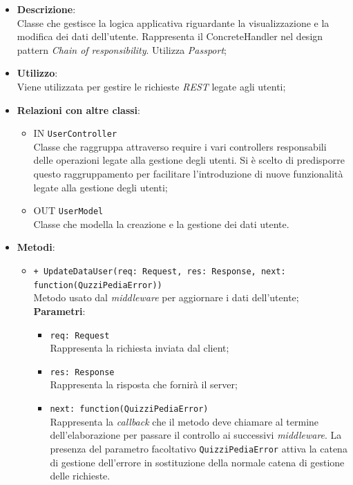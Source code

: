 \begin{itemize}
	\item 
	\textbf{Descrizione}:\\
	Classe che gestisce la logica applicativa riguardante la visualizzazione e la modifica dei dati dell'utente.
Rappresenta il ConcreteHandler nel design pattern \textit{Chain of responsibility}. Utilizza \textit{Passport};
	\item
	\textbf{Utilizzo}:\\
	Viene utilizzata per gestire le richieste \textit{REST} legate agli utenti;
	\item
	\textbf{Relazioni con altre classi}:
	\begin{itemize}
		\item
		IN \texttt{UserController} \\
		Classe che raggruppa attraverso require i vari controllers responsabili delle operazioni legate alla gestione degli utenti. Si è scelto di predisporre questo raggruppamento per facilitare l'introduzione di nuove funzionalità legate alla gestione degli utenti;
		\item
		OUT \texttt{UserModel} \\
		Classe che modella la creazione e la gestione dei dati utente.
	\end{itemize}
	\item
	\textbf{Metodi}:
	\begin{itemize}
		\item
		\texttt{+ UpdateDataUser(req: Request, res: Response, next: function(QuzziPediaError))} \\
		Metodo usato dal \textit{middleware} per aggiornare i dati dell'utente; \\
		\textbf{Parametri}:
		 \begin{itemize}
		  \item
			\texttt{req: Request} \\
			Rappresenta la richiesta inviata dal client;
		  \item
			\texttt{res: Response} \\
			Rappresenta la risposta che fornirà il server;
		  \item
		    \texttt{next: function(QuizziPediaError)} \\
			Rappresenta la \textit{callback} che il metodo deve chiamare al termine dell'elaborazione per passare il controllo ai successivi \textit{middleware}. La presenza del parametro facoltativo \texttt{QuizziPediaError} attiva la catena di gestione dell'errore in sostituzione della normale catena di gestione delle richieste.

\end{itemize}
\end{itemize}
\end{itemize}
